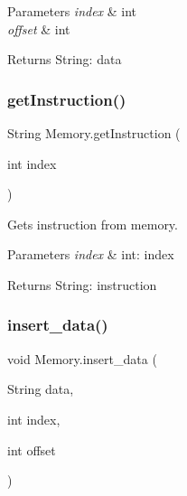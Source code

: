 \begin{DoxyParams}{Parameters}
{\em index} & int \\
\hline
{\em offset} & int \\
\hline
\end{DoxyParams}
\begin{DoxyReturn}{Returns}
String\+: data 
\end{DoxyReturn}
\mbox{\label{class_memory_a73c54ab9efefebf18ff0d8722dbe80e3}} 
\subsubsection{\texorpdfstring{get\+Instruction()}{getInstruction()}}
{\footnotesize\ttfamily String Memory.\+get\+Instruction (\begin{DoxyParamCaption}\item[{int}]{index }\end{DoxyParamCaption})\hspace{0.3cm}{\ttfamily [package]}}

Gets instruction from memory.


\begin{DoxyParams}{Parameters}
{\em index} & int\+: index \\
\hline
\end{DoxyParams}
\begin{DoxyReturn}{Returns}
String\+: instruction 
\end{DoxyReturn}
\mbox{\label{class_memory_a29f109643d88d66008afc916eae6cea6}} 
\subsubsection{\texorpdfstring{insert\+\_\+data()}{insert\_data()}}
{\footnotesize\ttfamily void Memory.\+insert\+\_\+data (\begin{DoxyParamCaption}\item[{String}]{data,  }\item[{int}]{index,  }\item[{int}]{offset }\end{DoxyParamCaption})\hspace{0.3cm}{\ttfamily [package]}}


